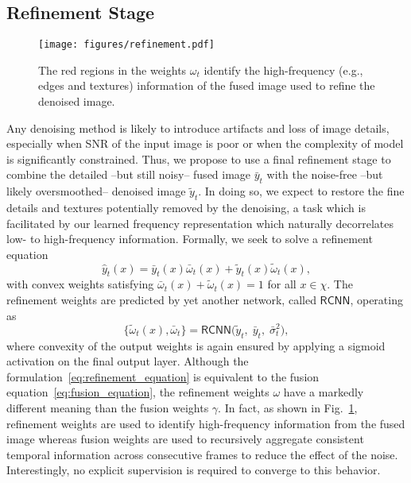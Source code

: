 \documentclass[final]{cvpr}
\newcommand{\comma}{,\;}
\begin{document}
    
    \subsection{Refinement Stage}

    \begin{figure}[t]
        \centering
        \texttt{[image: figures/refinement.pdf]}
        \caption{The red regions in the weights $\omega_t$ identify the high-frequency (e.g., edges and textures) information of the fused image used to refine the denoised image.}
        \label{fig:refinement} 
    \end{figure}
    
    Any denoising method is likely to introduce artifacts and loss of image details, especially when SNR of the input image is poor or when the complexity of model is significantly constrained. Thus, we propose to use a final refinement stage to combine the detailed --but still noisy-- fused image $\bar{y}_{t}$ with the noise-free --but likely oversmoothed-- denoised image $\tilde{y}_t$. In doing so, we expect to restore the fine details and textures potentially removed by the denoising, a task which is facilitated by our learned frequency representation which naturally decorrelates low- to high-frequency information. Formally, we seek to solve a refinement equation
    \begin{equation}
        \hat{y}_t(x) = \bar{y}_{t}(x) \bar{\omega}_{t}(x) + \tilde{y}_t(x) \tilde{\omega}_t(x),
        \label{eq:refinement_equation}
    \end{equation}
    with convex weights satisfying $\bar{\omega}_{t}(x) + \tilde{\omega}_{t}(x) = 1$ for all $x \in \chi$. The refinement weights are predicted by yet another network, called $\mathsf{RCNN}$, operating as
    \begin{equation}
        \big\{\tilde{\omega}_t(x), \bar{\omega}_{t}\big\} = \mathsf{RCNN}\Big( \tilde{y}_{t} \comma \bar{y}_{t} \comma \bar{\sigma}^2_t \Big),
        \label{eq:rcnn}
    \end{equation}
    where convexity of the output weights is again ensured by applying a sigmoid activation on the final output layer. Although the formulation~\eqref{eq:refinement_equation} is equivalent to the fusion equation~\eqref{eq:fusion_equation}, the refinement weights $\omega$ have a markedly different meaning than the fusion weights $\gamma$. In fact, as shown in Fig.~\ref{fig:refinement}, refinement weights are used to identify high-frequency information from the fused image whereas fusion weights are used to recursively aggregate consistent temporal information across consecutive frames to reduce the effect of the noise. Interestingly, no explicit supervision is required to converge to this behavior.
\end{document}
